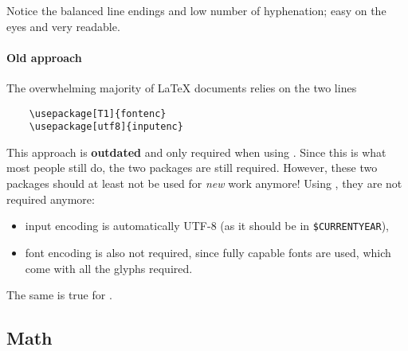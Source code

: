 \begin{displayquote}
    \blindtext
\end{displayquote}

Notice the balanced line endings and low number of hyphenation;
easy on the eyes and very readable.

\paragraph{Old approach}
The overwhelming majority of \LaTeX{} documents relies on the two lines
\begin{verbatim}
    \usepackage[T1]{fontenc}
    \usepackage[utf8]{inputenc}
\end{verbatim}
This approach is \textbf{outdated} and only required when using .
Since this is what most people still do, the two packages are still required.
However, these two packages should at least not be used for \emph{new} work anymore!
Using , they are not required anymore:
\begin{itemize}
    \item input encoding is automatically UTF-8 (as it should be in \verb|$CURRENTYEAR|),
    \item font encoding is also not required, since fully capable fonts are used,
          which come with all the glyphs required.
\end{itemize}
The same is true for .

\subsection{Math}
\label{subsec:math}

